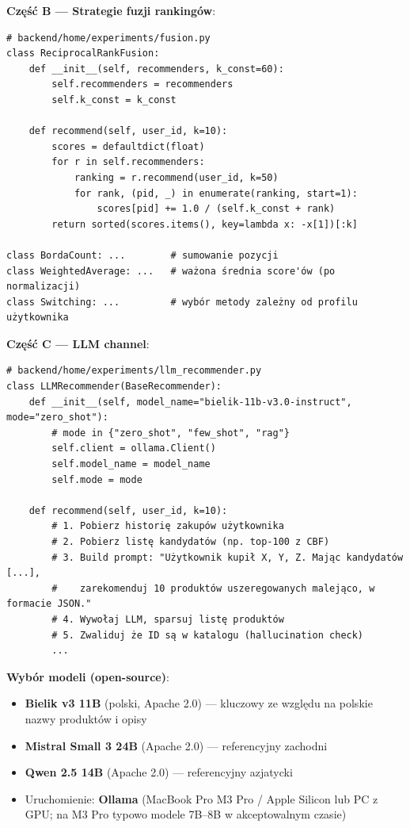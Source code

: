 \documentclass[a4paper,11pt]{article}
\begin{document}
\textbf{Część B --- Strategie fuzji rankingów}:

\begin{lstlisting}
# backend/home/experiments/fusion.py
class ReciprocalRankFusion:
    def __init__(self, recommenders, k_const=60):
        self.recommenders = recommenders
        self.k_const = k_const

    def recommend(self, user_id, k=10):
        scores = defaultdict(float)
        for r in self.recommenders:
            ranking = r.recommend(user_id, k=50)
            for rank, (pid, _) in enumerate(ranking, start=1):
                scores[pid] += 1.0 / (self.k_const + rank)
        return sorted(scores.items(), key=lambda x: -x[1])[:k]

class BordaCount: ...        # sumowanie pozycji
class WeightedAverage: ...   # ważona średnia score'ów (po normalizacji)
class Switching: ...         # wybór metody zależny od profilu użytkownika
\end{lstlisting}

\textbf{Część C --- LLM channel}:

\begin{lstlisting}
# backend/home/experiments/llm_recommender.py
class LLMRecommender(BaseRecommender):
    def __init__(self, model_name="bielik-11b-v3.0-instruct", mode="zero_shot"):
        # mode in {"zero_shot", "few_shot", "rag"}
        self.client = ollama.Client()
        self.model_name = model_name
        self.mode = mode

    def recommend(self, user_id, k=10):
        # 1. Pobierz historię zakupów użytkownika
        # 2. Pobierz listę kandydatów (np. top-100 z CBF)
        # 3. Build prompt: "Użytkownik kupił X, Y, Z. Mając kandydatów [...],
        #    zarekomenduj 10 produktów uszeregowanych malejąco, w formacie JSON."
        # 4. Wywołaj LLM, sparsuj listę produktów
        # 5. Zwaliduj że ID są w katalogu (hallucination check)
        ...
\end{lstlisting}

\textbf{Wybór modeli (open-source)}:

\begin{itemize}[leftmargin=1.5em,itemsep=2pt]
  \item \textbf{Bielik v3 11B} (polski, Apache 2.0) --- kluczowy ze względu na polskie nazwy produktów i opisy
  \item \textbf{Mistral Small 3 24B} (Apache 2.0) --- referencyjny zachodni
  \item \textbf{Qwen 2.5 14B} (Apache 2.0) --- referencyjny azjatycki
  \item Uruchomienie: \textbf{Ollama} (MacBook Pro M3 Pro / Apple Silicon lub PC z GPU; na M3 Pro typowo modele 7B--8B w akceptowalnym czasie)
\end{itemize}
\end{document}
